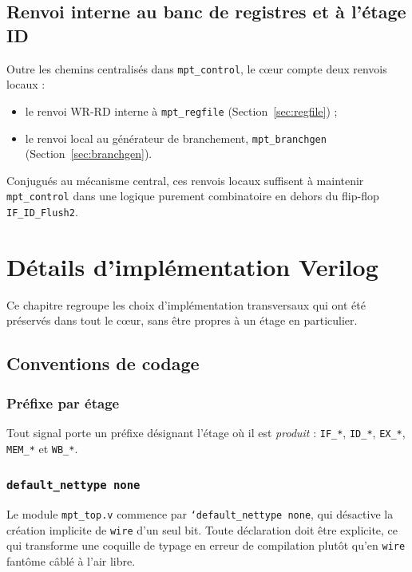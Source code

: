 \documentclass[11pt,a4paper,oneside]{report}
\begin{document}
\section{Renvoi interne au banc de registres et à l'étage ID}
Outre les chemins centralisés dans \texttt{mpt\_control}, le
c\oe{}ur compte deux renvois locaux :
\begin{itemize}
  \item le renvoi WR-RD interne à \texttt{mpt\_regfile}
        (Section~\ref{sec:regfile}) ;
  \item le renvoi local au générateur de branchement,
        \texttt{mpt\_branchgen} (Section~\ref{sec:branchgen}).
\end{itemize}
Conjugués au mécanisme central, ces renvois locaux suffisent à
maintenir \texttt{mpt\_control} dans une logique purement
combinatoire en dehors du flip-flop \texttt{IF\_ID\_Flush2}.




\chapter{Détails d'implémentation Verilog}
\label{ch:impl}

Ce chapitre regroupe les choix d'implémentation transversaux qui
ont été préservés dans tout le c\oe{}ur, sans être propres à un
étage en particulier.

\section{Conventions de codage}
\subsection{Préfixe par étage}
Tout signal porte un préfixe désignant l'étage où il est
\emph{produit} : \texttt{IF\_*}, \texttt{ID\_*}, \texttt{EX\_*},
\texttt{MEM\_*} et \texttt{WB\_*}.

\subsection{\texttt{default\_nettype none}}
Le module \texttt{mpt\_top.v} commence par
\texttt{`default\_nettype none}, qui désactive la création
implicite de \texttt{wire} d'un seul bit. Toute déclaration doit
être explicite, ce qui transforme une coquille de typage en
erreur de compilation plutôt qu'en \texttt{wire} fantôme câblé à
l'air libre.
\end{document}
